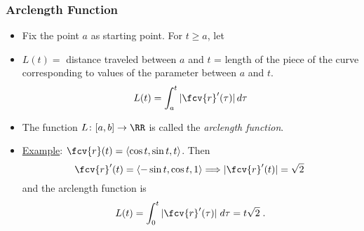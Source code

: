 \begin{frame}
\frametitle{Arclength Function}
\begin{itemize}
\item Fix the point $a$ as starting point. For $t \geqslant a$, let
\item $L(t) = $ distance traveled between $a$ and $t$ = length of the piece of the curve corresponding to values of the parameter between $a$ and $t$.
\[
L(t) =  \int_{a}^t |\fcv{r}'(\tau)| \, d\tau 
\]
\item The function $L\colon [a,b]\to \RR$ is called the \emph{arclength function}.
\item \underline{Example}: $\fcv{r}(t) = \langle \cos{t}, \sin{t}, t\rangle$. Then
\[\fcv{r}'(t) = \langle -\sin{t}, \cos{t}, 1 \rangle
\Longrightarrow |\fcv{r}'(t)| = \sqrt{2}\; 
\]
and the arclength function is
\[L(t) = \int_0^t |\fcv{r}'(\tau)| \; d\tau = t\sqrt{2} \; .\]
\end{itemize}

\end{frame}
